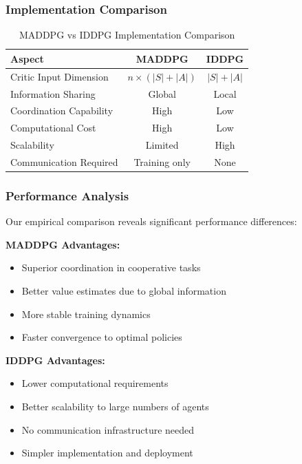 \documentclass[conference]{IEEEtran}
\begin{document}
{{\subsubsection{Implementation Comparison}

\begin{table}[h!]
\centering
\caption{MADDPG vs IDDPG Implementation Comparison}
\begin{tabular}{|l|c|c|}
\hline
\textbf{Aspect} & \textbf{MADDPG} & \textbf{IDDPG} \\
\hline
Critic Input Dimension & $n \times (|S| + |A|)$ & $|S| + |A|$ \\
Information Sharing & Global & Local \\
Coordination Capability & High & Low \\
Computational Cost & High & Low \\
Scalability & Limited & High \\
Communication Required & Training only & None \\
\hline
\end{tabular}
\label{tab:maddpg_vs_iddpg}
\end{table}

\subsubsection{Performance Analysis}

Our empirical comparison reveals significant performance differences:

\textbf{MADDPG Advantages:}
\begin{itemize}
    \item Superior coordination in cooperative tasks
    \item Better value estimates due to global information
    \item More stable training dynamics
    \item Faster convergence to optimal policies
\end{itemize}

\textbf{IDDPG Advantages:}
\begin{itemize}
    \item Lower computational requirements
    \item Better scalability to large numbers of agents
    \item No communication infrastructure needed
    \item Simpler implementation and deployment
\end{itemize}

}}
\end{document}
